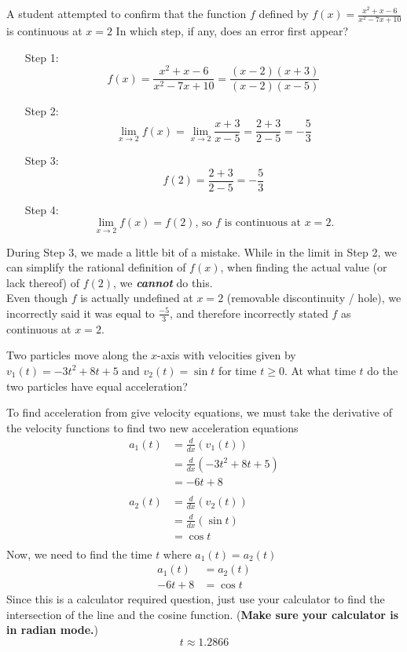 \documentclass[12pt,letterpaper, onecolumn]{exam}
\begin{document}
\begin{questions}
		\question A student attempted to confirm that the function $f$ defined by $f(x) = \frac{ x^2 + x - 6}{x^2 -7x + 10}$ is continuous at $x = 2$
		In which step, if any, does an error first appear?
			\begin{enumerate}
					\item [Step 1:] $$f(x) = \frac {x^2 + x - 6} {x^2 - 7x + 10} = \frac { (x-2) (x+3) } { (x-2) (x-5) }$$
					\item [Step 2:] $$ \lim_{x \to 2} f(x) = \lim_{x \to 2} \frac {x+3}{x-5} = \frac {2+3}{2-5} = - \frac{5}{3}$$
					\item [Step 3:] $$f(2) = \frac {2+3}{2-5} = - \frac{5}{3}$$
					\item [Step 4:] $$ \lim_{x \to 2} f(x) = f(2) \text{, so } f \text{ is continuous at } x=2.$$
			\end{enumerate}
			\begin{solution}
				During Step 3, we made a little bit of a mistake. While in the limit in Step 2, we can simplify the rational definition of $f(x)$, when finding the actual value (or lack thereof) of $f(2)$, we \textbf{\emph{cannot}} do this. \\
				Even though $f$ is actually undefined at $x=2$ (removable discontinuity / hole), we incorrectly said it was equal to $\frac{-5}{3}$, and therefore incorrectly stated $f$ as continuous at $x=2$. 
			\end{solution}
		
		\question Two particles move along the $x$-axis with velocities given by $v_1(t) = -3t^2 + 8t +5$ and $v_2(t) = \sin t$ for time $t \geq 0$. At what time $t$ do the two particles have equal acceleration?
			\begin{solution}
			
		
				To find acceleration from give velocity equations, we must take the derivative of the velocity functions to find two new acceleration equations
				\begin{align*}
					a_1(t) &= \frac{d}{dx} \left( v_1(t) \right) \\
							&= \frac{d}{dx} \left( -3t^2 + 8t +5 \right) \\
							&= -6t + 8 \\ \\
					a_2(t)	&= \frac{d}{dx} \left( v_2(t) \right) \\
							&= \frac{d}{dx} \left( \sin t \right) \\
							&= \cos t \\
				\end{align*}
				Now, we need to find the time $t$ where $a_1(t)=a_2(t)$
				\begin{align*}
					a_1(t) 	&= a_2(t) \\
					-6t + 8 &= \cos t
				\end{align*}
				Since this is a calculator required question, just use your calculator to find the intersection of the line and the cosine function. (\textbf{Make sure your calculator is in radian mode.})
				$$\boxed{t\approx 1.2866}$$
			\end{solution}
	

\end{questions}
\end{document}
